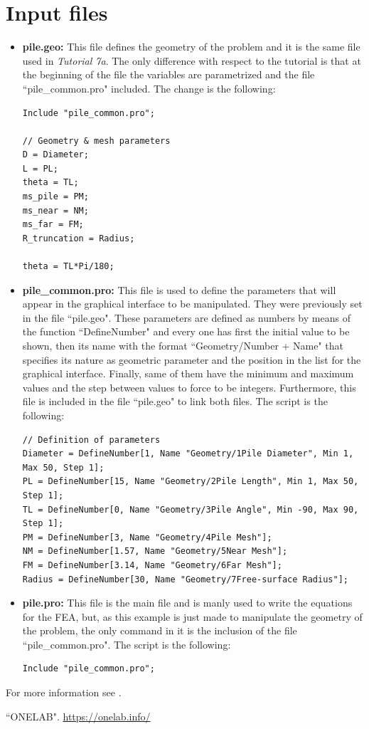 \documentclass[a4]{article}
\begin{document}
\section{Input files} 

\begin{itemize}
	\item \textbf{pile.geo:} This file defines the geometry of the problem and it is the same file used in \textit{Tutorial 7a}. The only difference with respect to the tutorial is that at the beginning of the file the variables are parametrized and the file ``pile\_common.pro" included. The change is the following:

\begin{Verbatim}	
Include "pile_common.pro";

// Geometry & mesh parameters
D = Diameter;
L = PL;
theta = TL;
ms_pile = PM;
ms_near = NM;
ms_far = FM;
R_truncation = Radius;

theta = TL*Pi/180;
\end{Verbatim}

	\item \textbf{pile\_common.pro:} This file is used to define the parameters that will appear in the graphical interface to be manipulated. They were previously set in the file ``pile.geo". These parameters are defined as numbers by means of the function ``DefineNumber" and every one has first the initial value to be shown, then its name with the format ``Geometry/Number + Name" that specifies its nature as geometric parameter and the position in the list for the graphical interface. Finally, same of them have the minimum and maximum values and the step between values to force to be integers. Furthermore, this file is included in the file ``pile.geo" to link both files. The script is the following:

\begin{Verbatim}
// Definition of parameters
Diameter = DefineNumber[1, Name "Geometry/1Pile Diameter", Min 1, Max 50, Step 1];
PL = DefineNumber[15, Name "Geometry/2Pile Length", Min 1, Max 50, Step 1];
TL = DefineNumber[0, Name "Geometry/3Pile Angle", Min -90, Max 90, Step 1];
PM = DefineNumber[3, Name "Geometry/4Pile Mesh"];
NM = DefineNumber[1.57, Name "Geometry/5Near Mesh"];
FM = DefineNumber[3.14, Name "Geometry/6Far Mesh"];
Radius = DefineNumber[30, Name "Geometry/7Free-surface Radius"];
\end{Verbatim}

	\item \textbf{pile.pro:} This file is the main file and is manly used to write the equations for the FEA, but, as this example is just made to manipulate the geometry of the problem, the only command in it is the inclusion of the file ``pile\_common.pro". The script is the following:

\begin{Verbatim}
Include "pile_common.pro";
\end{Verbatim}

\end{itemize}

For more information see \cite{onelabweb}. 

\FloatBarrier

\begin{thebibliography}{99}
		
	 ``ONELAB". \url{https://onelab.info/}

\end{thebibliography}
\end{document}
